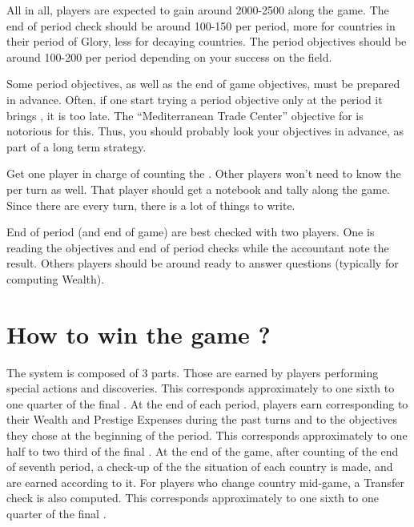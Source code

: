 \begin{designnote}
  All in all, players are expected to gain around 2000-2500 \VPs along the
  game. The end of period check should be around 100-150 \VPs per period, more
  for countries in their period of Glory, less for decaying countries. The
  period objectives should be around 100-200 \VPs per period depending on your
  success on the field.
\end{designnote}

\begin{playtip}
  Some period objectives, as well as the end of game objectives, must be
  prepared in advance. Often, if one start trying a period objective
  only at the period it brings \VPs, it is too late. The ``Mediterranean
  Trade Center'' objective for \FRA is notorious for this. Thus, you
  should probably look your objectives in advance, as part of a long
  term strategy.
\end{playtip}

\begin{playtip}
  Get one player in charge of counting the \VPs. Other players won't need to
  know the \VPs per turn as well. That player should get a notebook and tally
  \VPs along the game. Since there are \VPs every turn, there is a lot of
  things to write.

  End of period (and end of game) \VPs are best checked with two players. One
  is reading the objectives and end of period checks while the \VPs accountant
  note the result. Others players should be around ready to answer questions
  (typically for computing Wealth).
\end{playtip}

\section{How to win the game ?}

\aparag The \VP system is composed of 3 parts.
Those \VPs are earned by players performing special actions and
discoveries. This corresponds approximately to one sixth to one quarter of the
final \VPs.
At the end of each period, players earn \VPs corresponding to their Wealth and
Prestige Expenses during the past turns and to the objectives they chose at
the beginning of the period. This corresponds approximately to one half to two
third of the final \VPs.
At the end of the game, after counting \VPs of the end of seventh
period, a check-up of the the situation of each country is made, and
\VPs are earned according to it. For players who change country
mid-game, a Transfer check is also computed. This corresponds
approximately to one sixth to one quarter of the final \VPs.




